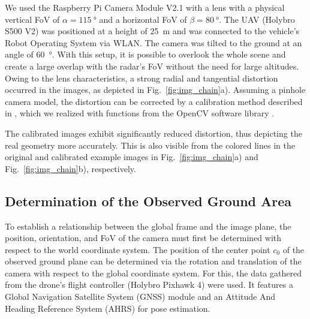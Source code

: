 \documentclass[conference]{IEEEtran}
\begin{document}
We used the Raspberry Pi Camera Module V2.1 with a lens with a physical vertical FoV of $\alpha = \SI{115}{\degree}$ and a horizontal FoV of $\beta = \SI{80}{\degree}$.
The UAV (Holybro S500 V2) was positioned at a height of \SI{25}{\m} and was connected to the vehicle's Robot Operating System via WLAN.
The camera was tilted to the ground at an angle of \SI{60}{\degree}.
With this setup, it is possible to overlook the whole scene and create a large overlap with the radar's FoV without the need for large altitudes.
Owing to the lens characteristics, a strong radial and tangential distortion occurred in the images, as depicted in Fig.~\ref{fig:img_chain}a).
Assuming a pinhole camera model, the distortion can be corrected by a calibration method described in \cite{b11}, which we realized with functions from the OpenCV software library \cite{b12}.

The calibrated images exhibit significantly reduced distortion, thus depicting the real geometry more accurately.
This is also visible from the colored lines in the original and calibrated example images in Fig.~\ref{fig:img_chain}a) and Fig.~\ref{fig:img_chain}b), respectively. 

%
%
\subsection{Determination of the Observed Ground Area}

To establish a relationship between the global frame and the image plane, the position, orientation, and FoV of the camera must first be determined with respect to the world coordinate system.
The position of the center point $c_0$ of the observed ground plane can be determined via the rotation and translation of the camera with respect to the global coordinate system.
For this, the data gathered from the drone's flight controller (Holybro Pixhawk 4) were used.
It features a Global Navigation Satellite System (GNSS) module and an Attitude And Heading Reference System (AHRS) for pose estimation.
\end{document}
